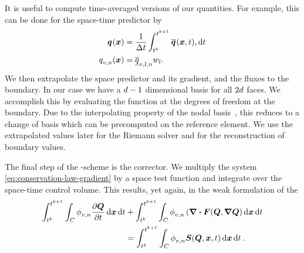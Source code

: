 It is useful to compute time-averaged versions of our quantities.
For example, this can be done for the space-time predictor by
\begin{align}\label{eq:time-average}
  \begin{split}
  \spredictor (\bm{x}) &= \frac{1}{\Delta t} \intdt{
\stpredictor(\bm{x}, t),
  } \\
\spredictor[][v,n] (\bm{x}) &= \stpredictorCoeff[][v,l,n] \quadWeight[l].
  \end{split}
\end{align}
We then extrapolate the space predictor and its gradient, and the fluxes to the boundary.
In our case we have a $d - 1$ dimensional basis for all $2 d$ faces.
We accomplish this by evaluating the function at the degrees of freedom at the boundary.
Due to the interpolating property of the nodal basis~, this reduces to a change of basis which can be precomputed on the reference element.
We use the extrapolated values later for the Riemann solver and for the reconstruction of boundary values.

The final step of the \aderdg{}-scheme is the corrector.
We multiply the system \cref{eq:conservation-law-gradient} by a space test function and integrate over the space-time control volume.
This results, yet again, in the weak formulation of the \pde{}
\begin{align}
  \begin{split}
  \label{eq:weak-pde}
\intdt{\intdcell{
\stestfunction[][v,n] \pdv{\Q}{t}
}}
&+
\intdt{\intdcell{
    \stestfunction[][v,n] \left( \div{\flux(\Q, \gradQ } \right)
}}
\\&=
\intdt{\intdcell{
    \stestfunction[][v,n] \source(\Q, \bm{x}, t)
}}.
  \end{split}
\end{align}

